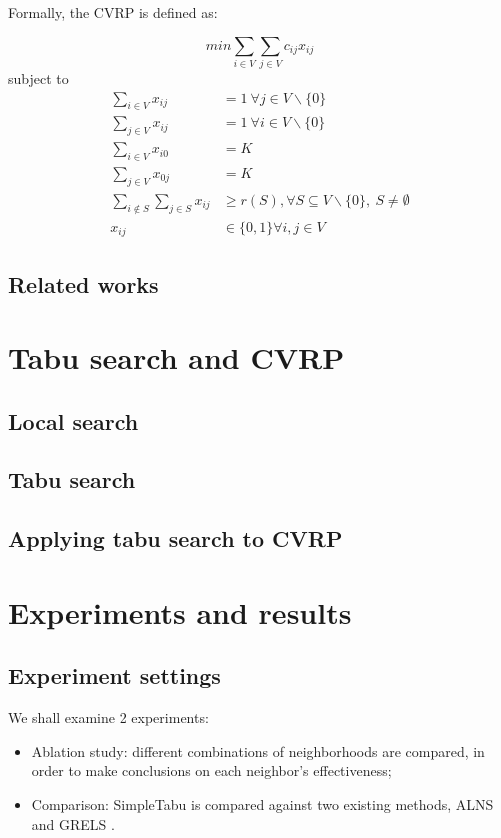 \documentclass{report}
\begin{document}
Formally, the CVRP is defined as:

\begin{equation}
    min \sum_{i \in V} \sum_{j \in V} c_{ij}x_{ij} \label{eq:form1}
\end{equation}
subject to
\begin{align}
    \sum_{i \in V} x_{ij} & = 1 \ \forall j \in V \backslash \{0\} \label{eq:form2} \\
    \sum_{j \in V} x_{ij} & = 1 \ \forall i \in V \backslash \{0\} \label{eq:form3} \\
    \sum_{i \in V} x_{i0} & = K \label{eq:form4} \\
    \sum_{j \in V} x_{0j} & = K \label{eq:form5} \\
    \sum_{i \notin S} \sum_{j \in S} x_{ij} & \geq r(S), \forall S \subseteq V \backslash \{0\},\ S \neq \emptyset \label{eq:form6} \\
    x_{ij} & \in \{ 0, 1 \} \forall i,j \in V \label{eq:form7}
\end{align}



\section{Related works}

\chapter{Tabu search and CVRP}
\section{Local search}

\section{Tabu search}

\section{Applying tabu search to CVRP}

\chapter{Experiments and results}
\section{Experiment settings}
We shall examine 2 experiments:
\begin{itemize}
	\item Ablation study: different combinations of neighborhoods are compared, in order to make conclusions on each neighbor's effectiveness;
	\item Comparison: SimpleTabu is compared against two existing methods, ALNS \cite{pisinger2007general} and GRELS \cite{prins2009grasp}.
\end{itemize}
\end{document}
